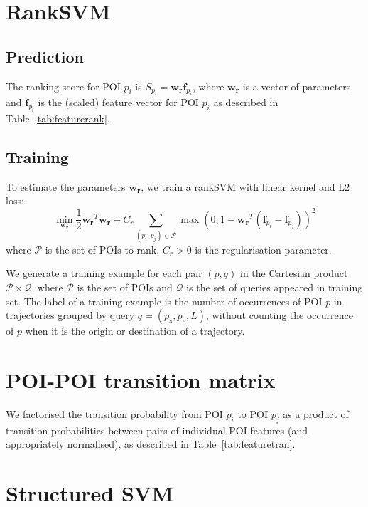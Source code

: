 \section{RankSVM}
\label{appendix:ranksvm}

\subsection{Prediction}
The ranking score for POI $p_i$ is $S_{p_i} = \mathbf{w_r} \mathbf{f}_{p_i}$,
where $\mathbf{w_r}$ is a vector of parameters,
and $\mathbf{f}_{p_i}$ is the (scaled) feature vector for POI $p_i$ as described in Table~\ref{tab:featurerank}.


\subsection{Training}
To estimate the parameters $\mathbf{w_r}$, we train a rankSVM with linear kernel and L$2$ loss:
\begin{displaymath}
\min_{\mathbf{w_r}} \frac{1}{2} \mathbf{w_r}^T \mathbf{w_r} +
                    C_r \sum_{(p_i, p_j) \in \mathcal{P}}
                    \max \left( 0, 1 - \mathbf{w_r}^T (\mathbf{f}_{p_i} - \mathbf{f}_{p_j}) \right)^2
\end{displaymath}
where $\mathcal{P}$ is the set of POIs to rank,
$C_r > 0$ is the regularisation parameter.

We generate a training example for each pair $(p, q)$ in the Cartesian product $\mathcal{P} \times \mathcal{Q}$,
where $\mathcal{P}$ is the set of POIs and $\mathcal{Q}$ is the set of queries appeared in training set.
The label of a training example is the number of occurrences of POI $p$ in trajectories grouped by query $q = (p_s, p_e, L)$,
without counting the occurrence of $p$ when it is the origin or destination of a trajectory.


\section{POI-POI transition matrix}

\label{appendix:transition}
We factorised the transition probability from POI $p_i$ to POI $p_j$
as a product of transition probabilities between pairs of 
individual POI features (and appropriately normalised), as described in Table~\ref{tab:featuretran}.


\section{Structured SVM}
\label{appendix:ssvm}

